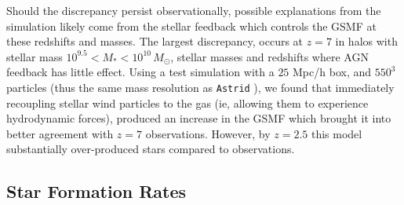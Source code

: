 \documentclass[fleqn,usenatbib]{mnras}
\def\astrid{\texttt{Astrid} }
\def\msun{\, M_{\odot}}
\begin{document}
Should the discrepancy persist observationally, possible explanations from the simulation likely come from the stellar feedback which controls the GSMF at these redshifts and masses. The largest discrepancy, occurs at $z=7$ in halos with stellar mass $10^{9.5} < M_* < 10^{10} \msun$, stellar masses and redshifts where AGN feedback has little effect. Using a test simulation with a $25$ Mpc/h box, and $550^3$ particles (thus the same mass resolution as \astrid), we found that immediately recoupling stellar wind particles to the gas (ie, allowing them to experience hydrodynamic forces), produced an increase in the GSMF which brought it into better agreement with $z=7$ observations. However, by $z=2.5$ this model  substantially over-produced stars compared to observations.





\subsection{Star Formation Rates}
\label{sec:sfr}
\end{document}
